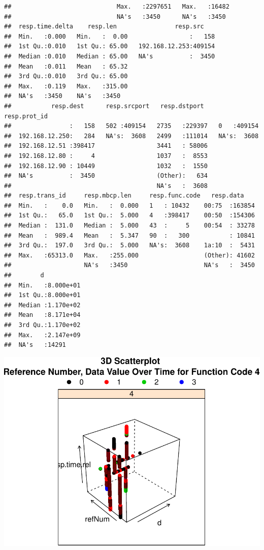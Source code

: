 \documentclass[]{article}
\begin{document}
\begin{verbatim}
##                             Max.   :2297651   Max.   :16482  
##                             NA's   :3450      NA's   :3450   
##  resp.time.delta    resp.len                resp.src     
##  Min.   :0.000   Min.   :  0.00                 :   158  
##  1st Qu.:0.010   1st Qu.: 65.00   192.168.12.253:409154  
##  Median :0.010   Median : 65.00   NA's          :  3450  
##  Mean   :0.011   Mean   : 65.32                          
##  3rd Qu.:0.010   3rd Qu.: 65.00                          
##  Max.   :0.119   Max.   :315.00                          
##  NA's   :3450    NA's   :3450                            
##           resp.dest      resp.srcport   resp.dstport    resp.prot_id 
##                :   158   502 :409154   2735   :229397   0   :409154  
##  192.168.12.250:   284   NA's:  3608   2499   :111014   NA's:  3608  
##  192.168.12.51 :398417                 3441   : 58006                
##  192.168.12.80 :     4                 1037   :  8553                
##  192.168.12.90 : 10449                 1032   :  1550                
##  NA's          :  3450                 (Other):   634                
##                                        NA's   :  3608                
##  resp.trans_id     resp.mbcp.len     resp.func.code   resp.data     
##  Min.   :    0.0   Min.   :  0.000   1   : 10432    00:75  :163854  
##  1st Qu.:   65.0   1st Qu.:  5.000   4   :398417    00:50  :154306  
##  Median :  131.0   Median :  5.000   43  :     5    00:54  : 33278  
##  Mean   :  989.4   Mean   :  5.347   90  :   300           : 10841  
##  3rd Qu.:  197.0   3rd Qu.:  5.000   NA's:  3608    1a:10  :  5431  
##  Max.   :65313.0   Max.   :255.000                  (Other): 41602  
##                    NA's   :3450                     NA's   :  3450  
##        d            
##  Min.   :8.000e+01  
##  1st Qu.:8.000e+01  
##  Median :1.170e+02  
##  Mean   :8.171e+04  
##  3rd Qu.:1.170e+02  
##  Max.   :2.147e+09  
##  NA's   :14291
\end{verbatim}

\pagebreak

\includegraphics{edaReport_files/figure-latex/unnamed-chunk-40-1.pdf}
\end{document}

